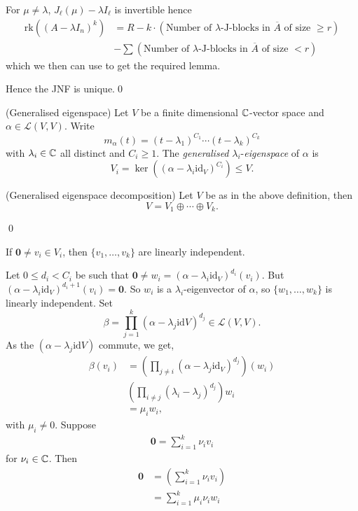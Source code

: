 \documentclass{article}
\newcommand{\rk}{\mathrm{rk}}
\renewcommand{\id}{\mathrm{id}}
\begin{document}
For $ \mu \ne \lambda $, $ J_\ell(\mu)-\lambda I_\ell $ is invertible hence 
\begin{align*}
	\rk((A-\lambda I_n)^k) & = R-k\cdot (\text{Number of }\lambda\text{-J-blocks in } \overline A\text { of size } \ge r)\\ &- \sum (\text{Number of }\lambda\text{-J-blocks in } \overline A\text { of size } < r)
\end{align*}
which we then can use to get the required lemma.\par
Hence the JNF is unique.\qed
\begin{definition}
	(Generalised eigenspace) Let $ V $ be a finite dimensional $ \mathbb{C} $-vector space and $ \alpha\in \mathcal L(V,V) $. Write
  \[
	  m_\alpha(t)=(t-\lambda_1)^{C_1}\cdots (t-\lambda_k)^{C_k}
  \]
  with $ \lambda_i\in \mathbb{C} $ all distinct and $ C_i\ge 1 $. The \textit{generalised} $ \lambda_i $-\textit{eigenspace} of $ \alpha $ is 
  \[
	  V_i=\ker((\alpha-\lambda_i\id_V)^{C_i})\le V.
  \]
\end{definition}
\begin{theorem}
	(Generalised eigenspace decomposition) Let $ V $ be as in the above definition, then
	\[
	  V=V_1\oplus \cdots \oplus V_k.
	\]
\end{theorem}
 \qed
\begin{lemma}
	If $ \mathbf 0\ne v_i\in V_i $, then $ \{v_1,\dots, v_k\} $ are linearly independent.
\end{lemma}
\pf Let $ 0\le d_i < C_i $ be such that $ \mathbf 0 \ne w_i=(\alpha-\lambda_i \id_V)^{d_i}(v_i) $. But $ (\alpha-\lambda_i\id_V)^{d_i+1}(v_i)=\mathbf 0 $. So $ w_i $ is a $ \lambda_i $-eigenvector of $ \alpha $, so $ \{w_1,\dots, w_k\} $ is linearly independent. Set
\[
	\beta=\prod_{j=1}^k(\alpha-\lambda_j\id V)^{d_j}\in \mathcal L(V,V).
\]
As the $ (\alpha-\lambda_j\id V) $ commute, we get,
\begin{align*}
	\beta(v_i)&=\left(\prod_{j\ne i}(\alpha-\lambda_j\id_V)^{d_j}\right)(w_i)\\
		  &\left(\prod_{i\ne j}(\lambda_i-\lambda_j)^{d_j}\right)w_i\\
		  &=\mu_iw_i,
\end{align*}
with $ \mu_i\ne0 $. Suppose
\begin{align*}
	\mathbf 0=\sum_{i=1}^k\nu_iv_i
\end{align*}
for $ \nu_i\in \mathbb{C} $. Then
\begin{align*}
	\mathbf 0 &= \left(\sum_{i=1}^k\nu_i v_i\right) \\
		  &= \sum_{i=1}^k \mu_i\nu_i w_i
\end{align*}
\end{document}
